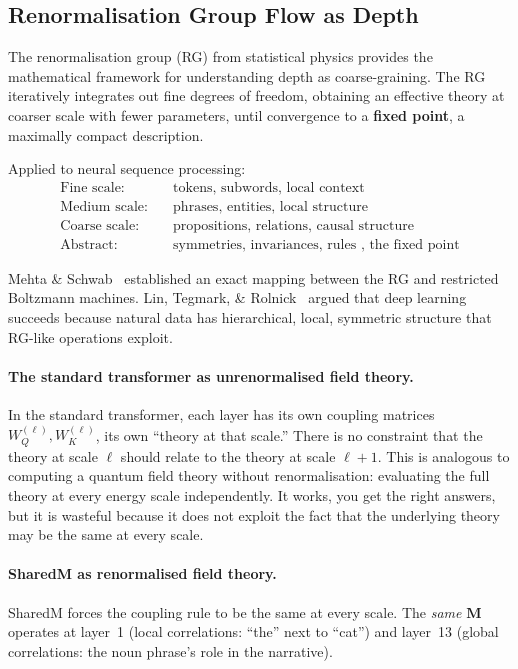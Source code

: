 \documentclass[11pt, a4paper]{article}
\newcommand{\M}{\mathbf{M}}
\theoremstyle{remark}
\begin{document}
\subsection{Renormalisation Group Flow as Depth}

The renormalisation group (RG) from statistical physics provides the mathematical framework for understanding depth as coarse-graining.
The RG iteratively integrates out fine degrees of freedom, obtaining an effective theory at coarser scale with fewer parameters, until convergence to a \textbf{fixed point}, a maximally compact description.

Applied to neural sequence processing:
\begin{align*}
    \text{Fine scale:}    & \quad \text{tokens, subwords, local context} \\
    \text{Medium scale:}  & \quad \text{phrases, entities, local structure} \\
    \text{Coarse scale:}  & \quad \text{propositions, relations, causal structure} \\
    \text{Abstract:}      & \quad \text{symmetries, invariances, rules ,  the fixed point}
\end{align*}

Mehta \& Schwab~\cite{mehta2014exact} established an exact mapping between the RG and restricted Boltzmann machines.
Lin, Tegmark, \& Rolnick~\cite{lin2017does} argued that deep learning succeeds because natural data has hierarchical, local, symmetric structure that RG-like operations exploit.

\paragraph{The standard transformer as unrenormalised field theory.}
In the standard transformer, each layer has its own coupling matrices $W_Q^{(\ell)}, W_K^{(\ell)}$, its own ``theory at that scale.''
There is no constraint that the theory at scale $\ell$ should relate to the theory at scale $\ell{+}1$.
This is analogous to computing a quantum field theory without renormalisation: evaluating the full theory at every energy scale independently.
It works, you get the right answers, but it is wasteful because it does not exploit the fact that the underlying theory may be the same at every scale.

\paragraph{SharedM as renormalised field theory.}
SharedM forces the coupling rule to be the same at every scale.
The \emph{same} $\M$ operates at layer~1 (local correlations: ``the'' next to ``cat'') and layer~13 (global correlations: the noun phrase's role in the narrative).
\end{document}
